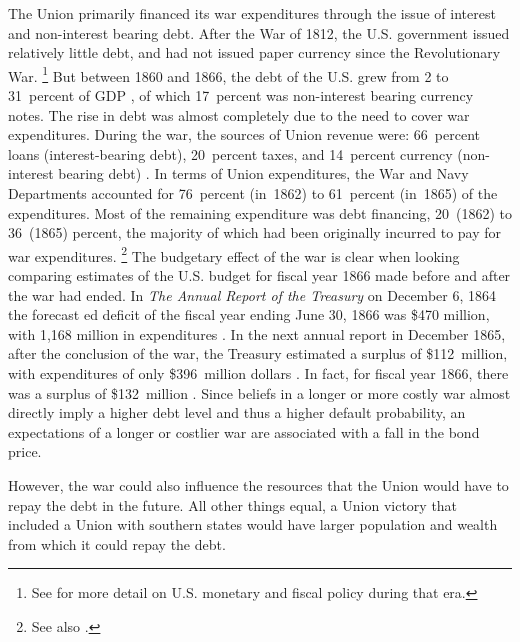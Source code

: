 \documentclass[11pt, oneside, article]{memoir}
\begin{document}
The Union primarily financed its war expenditures through the issue of interest and non-interest bearing debt.
After the War of 1812, the U.S. government issued relatively little debt, and had not issued paper currency since the Revolutionary War.%
\footnote{See \textcites{dewey1918financial}{HomerSylla2005} for more detail on U.S. monetary and fiscal policy during that era.} %
But between 1860 and 1866, the debt of the U.S. grew from 2 to 31~percent of GDP \parencites[Figure 1.5]{CBO2012}{CBO2012a}, of which 17~percent was non-interest bearing currency notes.
The rise in debt was almost completely due to the need to cover war expenditures.
During the war, the sources of Union revenue were: 66~percent loans
(interest-bearing debt), 20~percent taxes, and 14~percent currency (non-interest bearing debt) \parencite[][255]{Ball1991}. 
In terms of Union expenditures, the War and Navy Departments accounted for 76~percent (in~1862) to 61~percent (in~1865) of the expenditures.
Most of the remaining expenditure was debt financing, 20~(1862) to 36~(1865) percent, the majority of which had been originally incurred to pay for war expenditures.
\footnote{See also \textcite[][14]{Godfrey1976}.} %
The budgetary effect of the war is clear when looking comparing estimates of the U.S. budget for fiscal year 1866 made before and after the war had ended.
In \textit{The Annual Report of the Treasury} on December 6, 1864 the forecast ed deficit of the fiscal year ending June 30, 1866 was \$470 million,  with 1,168 million in expenditures  \parencite[13][]{Treasury1864}.
In the next annual report in December 1865, after the conclusion of the war, the Treasury estimated a surplus of \$112~million, with expenditures of only \$396~million dollars \parencite{Treasury1865}.
In fact, for fiscal year 1866, there was a surplus of \$132~million \parencite[2][]{Treasury1865}.
Since beliefs in a longer or more costly war almost directly imply a higher debt level and thus a higher default probability, an expectations of a longer or costlier war are associated with a fall in the bond price.

However, the war could also influence the resources that the Union would have to repay the debt in the future.
All other things equal, a Union victory that included a Union with southern states would have larger population and wealth from which it could repay the debt.

\end{document}
